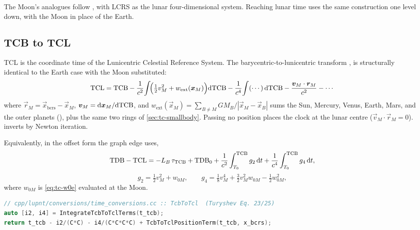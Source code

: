 The Moon's analogues follow \citet{turyshev2026cislunar}, with LCRS as the
lunar four-dimensional system. Reaching lunar time uses the same construction
one level down, with the Moon in place of the Earth.

\subsection{TCB to TCL}

TCL is the coordinate time of the Lunicentric Celestial Reference System. The
barycentric-to-lunicentric transform \citep[Eqs.~23,~25]{turyshev2026cislunar},
\citep[Eqs.~2.44--2.45]{iiyama2026thesis} is structurally identical to the
Earth case with the Moon substituted:
%
\begin{equation}
\label{eq:tc-tcbtcl}
  \mathrm{TCL} = \mathrm{TCB}
    - \frac{1}{c^2}\!\int\!\Bigl(\tfrac{1}{2}v_M^2 + w_{\mathrm{ext}}(\bm{x}_M)\Bigr)\mathrm{d}\mathrm{TCB}
    - \frac{1}{c^4}\!\int (\cdots)\,\mathrm{d}\mathrm{TCB}
    - \frac{\bm{v}_M \cdot \bm{r}_M}{c^2} - \cdots
\end{equation}
%
where $\vec{r}_M = \vec{x}_{\mathrm{bcrs}} - \vec{x}_M$,
$\bm{v}_M = \mathrm{d}\bm{x}_M/\mathrm{d}\mathrm{TCB}$, and
$w_{\mathrm{ext}}(\vec{x}_M) = \sum_{B \neq M} GM_B / |\vec{x}_M - \vec{x}_B|$
sums the Sun, Mercury, Venus, Earth, Mars, and the outer planets
(), plus the same two rings of
\cref{sec:tc-smallbody}. Passing no position places the clock at the lunar
centre ($\vec{v}_M \cdot \vec{r}_M = 0$).  inverts by Newton
iteration.

Equivalently, in the offset form the graph edge uses,
%
\begin{equation}
\label{eq:tc-tcl}
  \mathrm{TDB} - \mathrm{TCL}
   = -L_B\,\tau_{\mathrm{TCB}} + \mathrm{TDB}_0
   + \frac{1}{c^{2}} \int_{T_0}^{\mathrm{TCB}} g_2 \,\mathrm{d} t
   + \frac{1}{c^{4}} \int_{T_0}^{\mathrm{TCB}} g_4 \,\mathrm{d} t,
\end{equation}
%
\begin{equation}
\label{eq:tc-g24}
  g_2 = \tfrac{1}{2} v_M^{2} + w_{0M},
  \qquad
  g_4 = \tfrac{1}{8} v_M^{4} + \tfrac{3}{2} v_M^{2} w_{0M} - \tfrac{1}{2} w_{0M}^{2},
\end{equation}
%
where $w_{0M}$ is \cref{eq:tc-w0e} evaluated at the Moon.

\begin{lstlisting}[language=cpp]
// cpp/lupnt/conversions/time_conversions.cc :: TcbToTcl  (Turyshev Eq. 23/25)
auto [i2, i4] = IntegrateTcbToTclTerms(t_tcb);
return t_tcb - i2/(C*C) - i4/(C*C*C*C) + TcbToTclPositionTerm(t_tcb, x_bcrs);
\end{lstlisting}

